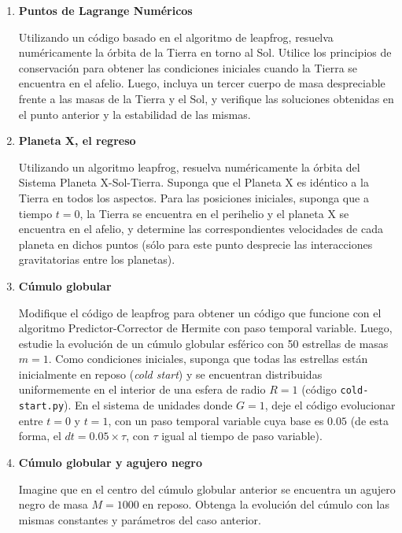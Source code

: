 \documentclass[a4paper,12pt]{article}
\begin{document}
\begin{enumerate}
  \item {\bf{Puntos de Lagrange Numéricos}}

    Utilizando un código basado en el algoritmo de leapfrog, resuelva
    numéricamente la órbita de la Tierra en torno al Sol. Utilice los
    principios de conservación para obtener las condiciones iniciales
    cuando la Tierra se encuentra en el afelio. Luego, incluya un tercer
    cuerpo de masa despreciable frente a las masas de la Tierra y el Sol,
    y verifique las soluciones obtenidas en el punto anterior y la
    estabilidad de las mismas. 

  \item {\bf{Planeta X, el regreso}}

    Utilizando un algoritmo leapfrog, resuelva numéricamente la órbita del
    Sistema Planeta X-Sol-Tierra. Suponga que el Planeta X es idéntico a
    la Tierra en todos los aspectos. Para las posiciones iniciales,
    suponga que a tiempo $t=0$, la Tierra se encuentra en el perihelio y
    el planeta X se encuentra en el afelio, y determine las
    correspondientes velocidades de cada planeta en dichos puntos (sólo
    para este punto desprecie las interacciones gravitatorias entre los
    planetas).

  \item {\bf{Cúmulo globular}}

    Modifique el código de leapfrog para obtener un código que funcione
    con el algoritmo Predictor-Corrector de Hermite con paso temporal
    variable. Luego, estudie la evolución de un cúmulo globular esférico
    con 50 estrellas de masas $m=1$. Como condiciones iniciales,
    suponga que todas las estrellas están inicialmente en reposo
    ({\emph{cold start}}) y se encuentran distribuidas uniformemente en el
    interior de una esfera de radio $R=1$ (código {\texttt{cold-start.py}}).
    En el sistema de unidades donde $G=1$, deje el código evolucionar entre
    $t=0$ y $t=1$, con un paso temporal variable cuya base es $0.05$ (de esta
    forma, el $dt=0.05\times \tau$, con $\tau$ igual al tiempo de paso
    variable).

  \item {\bf{Cúmulo globular y agujero negro}}

    Imagine que en el centro del cúmulo globular anterior se encuentra un
    agujero negro de masa $M=1000$ en reposo. Obtenga la evolución del cúmulo
    con las mismas constantes y parámetros del caso anterior. 

\end{enumerate}
\end{document}
